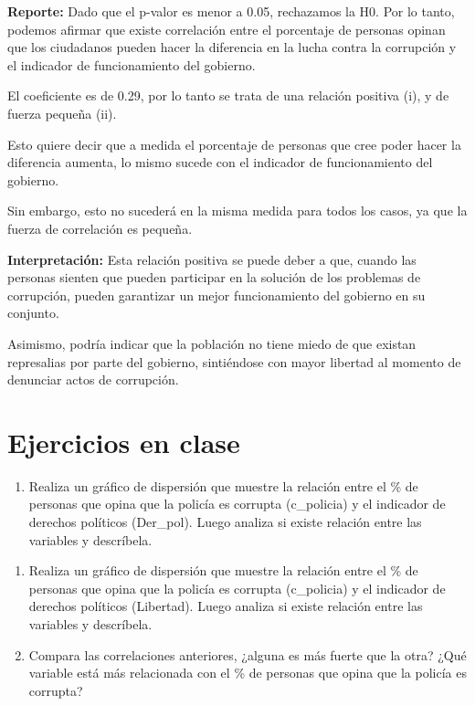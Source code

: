 \documentclass[
]{article}
\providecommand{\tightlist}{%
  \setlength{\itemsep}{0pt}\setlength{\parskip}{0pt}}
\begin{document}
\textbf{Reporte:} Dado que el p-valor es menor a 0.05, rechazamos la H0.
Por lo tanto, podemos afirmar que existe correlación entre el porcentaje
de personas opinan que los ciudadanos pueden hacer la diferencia en la
lucha contra la corrupción y el indicador de funcionamiento del
gobierno.

El coeficiente es de 0.29, por lo tanto se trata de una relación
positiva (i), y de fuerza pequeña (ii).

Esto quiere decir que a medida el porcentaje de personas que cree poder
hacer la diferencia aumenta, lo mismo sucede con el indicador de
funcionamiento del gobierno.

Sin embargo, esto no sucederá en la misma medida para todos los casos,
ya que la fuerza de correlación es pequeña.

\textbf{Interpretación:} Esta relación positiva se puede deber a que,
cuando las personas sienten que pueden participar en la solución de los
problemas de corrupción, pueden garantizar un mejor funcionamiento del
gobierno en su conjunto.

Asimismo, podría indicar que la población no tiene miedo de que existan
represalias por parte del gobierno, sintiéndose con mayor libertad al
momento de denunciar actos de corrupción.

\hypertarget{ejercicios-en-clase}{%
\section{Ejercicios en clase}\label{ejercicios-en-clase}}

\begin{enumerate}
\def\labelenumi{\arabic{enumi}.}
\tightlist
\item
  Realiza un gráfico de dispersión que muestre la relación entre el \%
  de personas que opina que la policía es corrupta (c\_policia) y el
  indicador de derechos políticos (Der\_pol). Luego analiza si existe
  relación entre las variables y descríbela.
\end{enumerate}

\begin{enumerate}
\def\labelenumi{\arabic{enumi}.}
\setcounter{enumi}{1}
\tightlist
\item
  Realiza un gráfico de dispersión que muestre la relación entre el \%
  de personas que opina que la policía es corrupta (c\_policia) y el
  indicador de derechos políticos (Libertad). Luego analiza si existe
  relación entre las variables y descríbela.
\item
  Compara las correlaciones anteriores, ¿alguna es más fuerte que la
  otra? ¿Qué variable está más relacionada con el \% de personas que
  opina que la policía es corrupta?
\end{enumerate}
\end{document}
